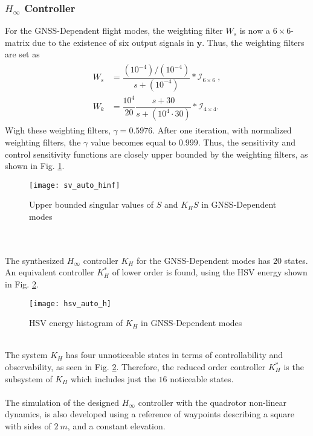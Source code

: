 \subsubsection{$H_\infty$ Controller}
For the GNSS-Dependent flight modes, the weighting filter $W_s$ is now a $6\times 6$-matrix due to the existence of six output signals in $\mathbf{y}$. Thus, the weighting filters are set as
\begin{align}
\begin{split}
W_{s} &= \dfrac{(10^{-4})/(10^{-4})}{s + (10^{-4})}*\mathcal{I}_{6\times 6}\ ,\\[5px]
W_{k} &= \dfrac{10^{4}}{20}\dfrac{s+30}{s+(10^{4}\cdot 30)}*\mathcal{I}_{4\times 4}.
\end{split}
\end{align}
Wigh these weighting filters, $\gamma = 0.5976$. After one iteration, with normalized weighting filters, the $\gamma$ value becomes equal to $0.999$. Thus, the sensitivity and control sensitivity functions are closely upper bounded by the weighting filters, as shown in Fig. \ref{fig:sv_auto_hinf}.
\begin{figure}[h]
\begin{center}
\texttt{[image: sv\_auto\_hinf]}  
\caption{Upper bounded singular values of $S$ and $K_{H}S$ in GNSS-Dependent modes} 
\label{fig:sv_auto_hinf}
\end{center}
\end{figure}
\\\\The synthesized $H_\infty$ controller $K_H$ for the GNSS-Dependent modes has $20$ states. An equivalent controller $K_{H}^{*}$ of lower order is found, using the HSV energy shown in Fig. \ref{fig:hsv_auto_h}.
\begin{figure}[h]
\begin{center}
\texttt{[image: hsv\_auto\_h]}  
\caption{HSV energy histogram of $K_H$ in GNSS-Dependent modes} 
\label{fig:hsv_auto_h}
\end{center}
\end{figure}
\\The system $K_H$ has four unnoticeable states in terms of controllability and observability, as seen in Fig. \ref{fig:hsv_auto_h}. Therefore, the reduced order controller $K_{H}^{*}$ is the subsystem of $K_H$ which includes just the $16$ noticeable states.
\\\\
The simulation of the designed $H_\infty$ controller with the quadrotor non-linear dynamics, is also developed using a reference of waypoints describing a square with sides of $2\ m$, and a constant elevation.
